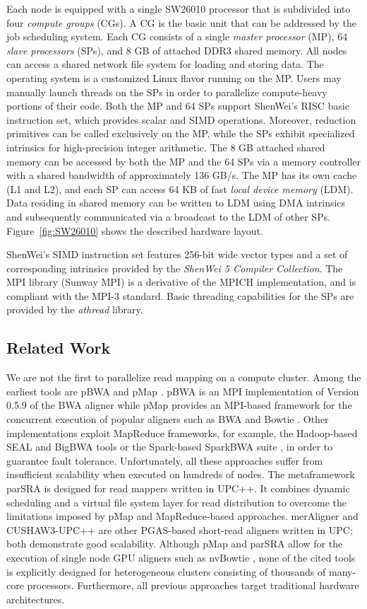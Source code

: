 \documentclass[conference]{IEEEtran}
\begin{document}
Each node is equipped with a single SW26010 processor that is subdivided into four {\em compute groups} (CGs). A CG is the basic unit that can be addressed by the job scheduling system. Each CG consists of a single {\em master processor} (MP), 64 {\em slave processors} (SPs), and 8 GB of attached DDR3 shared memory. All nodes can access a shared network file system for loading and storing data. The operating system is a customized Linux flavor running on the MP.  Users may manually launch threads on the SPs in order to parallelize compute-heavy portions of their code. Both the MP and 64 SPs support ShenWei's RISC basic instruction set, which provides scalar and SIMD operations. Moreover, reduction primitives can be called exclusively on the MP, while the SPs exhibit specialized intrinsics for high-precision integer arithmetic. The 8 GB attached shared memory can be accessed by both the MP and the 64 SPs via a memory controller with a shared bandwidth of approximately 136 GB/s. The MP has its own cache (L1 and L2), and each SP can access 64 KB of fast {\em local device memory} (LDM). Data residing in shared memory can be written to LDM using DMA intrinsics and subsequently communicated via a broadcast to the LDM of other SPs. Figure~\ref{fig:SW26010} shows the described hardware layout.

ShenWei's SIMD instruction set features 256-bit wide vector types and a set of corresponding intrinsics provided by the \emph{ShenWei 5 Compiler Collection}.  The MPI library (Sunway MPI) is a derivative of the MPICH implementation, and is compliant with the MPI-3 standard.  Basic threading capabilities for the SPs are provided by the \emph{athread} library.

\subsection{Related Work}
We are not the first to parallelize read mapping on a compute cluster. Among the earliest tools are pBWA \cite{pbwa} and pMap \cite{pmap}. pBWA is an MPI implementation of Version 0.5.9 of the BWA aligner while pMap provides an MPI-based framework for the concurrent execution of popular aligners such as BWA \cite{bwa} and Bowtie \cite{bowtie}. Other implementations exploit MapReduce frameworks, for example, the Hadoop-based SEAL \cite{seal} and BigBWA \cite{bigbwa} tools or the Spark-based SparkBWA suite \cite{sparkBWA}, in order to guarantee fault tolerance. Unfortunately, all these approaches suffer from insufficient scalability when executed on hundreds of nodes. The metaframework parSRA \cite{parSRA} is designed for read mappers written in UPC++.  It combines dynamic scheduling and a virtual file system layer for read distribution to overcome the limitations imposed by pMap and MapReduce-based approaches. merAligner \cite{merAligner} and CUSHAW3-UPC++ \cite{cushaw3upc} are other PGAS-based short-read aligners written in UPC; both demonstrate good scalability. Although pMap and parSRA allow for the execution of single node GPU aligners such as nvBowtie \cite{nvBio}, none of the cited tools is explicitly designed for heterogeneous clusters consisting of thousands of many-core processors. Furthermore, all previous approaches target traditional hardware architectures. 
\end{document}
